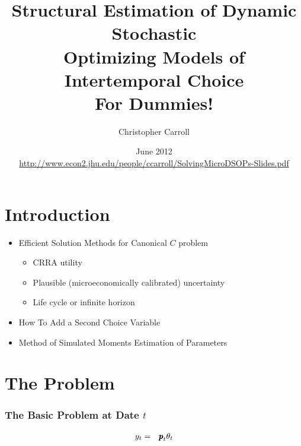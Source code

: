 \documentclass{beamer}
\begin{document}

\title[SolvingMicroDSOPs]{\textbf{Structural Estimation of Dynamic Stochastic\\ Optimizing Models of Intertemporal Choice \\ \LARGE{For Dummies!}}}
\author[Carroll]{Christopher Carroll}

\date{June 2012 \\ {\tiny \url{http://www.econ2.jhu.edu/people/ccarroll/SolvingMicroDSOPs-Slides.pdf}}
}


\begin{frame}[plain]
  \titlepage
\end{frame}

\section{Introduction}

\begin{frame}
\begin{itemize}
\item Efficient Solution Methods for Canonical $C$ problem
\begin{itemize}
\item CRRA utility
\item Plausible (microeconomically calibrated) uncertainty
\item Life cycle or infinite horizon
\end{itemize}
\item How To Add a Second Choice Variable
\item Method of Simulated Moments Estimation of Parameters
\end{itemize}
\end{frame}

\section{The Problem}

\begin{frame}[label=MaxProb]
\frametitle{\large\textbf{The Basic Problem at Date $t$}}


\begin{eqnarray}
{\ensuremath{y}}_{t} & = & {\pmb{p}}_{t}\theta_{t}
\end{eqnarray}

\end{frame}
\end{document}
